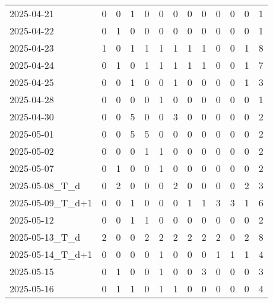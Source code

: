 \documentclass[dvipdfmx,oneside]{article}
\begin{document}
\begin{longtable}{lcccccccccccc}
        2025-04-21 &     0 &     0 &     1 &     0 &     0 &     0 &     0 &     0 &     0 &     0 &     0 &      1 \\
        2025-04-22 &     0 &     1 &     0 &     0 &     0 &     0 &     0 &     0 &     0 &     0 &     0 &      1 \\
        2025-04-23 &     1 &     0 &     1 &     1 &     1 &     1 &     1 &     1 &     0 &     0 &     1 &      8 \\
        2025-04-24 &     0 &     1 &     0 &     1 &     1 &     1 &     1 &     1 &     0 &     0 &     1 &      7 \\
        2025-04-25 &     0 &     0 &     1 &     0 &     0 &     1 &     0 &     0 &     0 &     0 &     1 &      3 \\
        2025-04-28 &     0 &     0 &     0 &     0 &     1 &     0 &     0 &     0 &     0 &     0 &     0 &      1 \\
        2025-04-30 &     0 &     0 &     5 &     0 &     0 &     3 &     0 &     0 &     0 &     0 &     0 &      2 \\
        2025-05-01 &     0 &     0 &     5 &     5 &     0 &     0 &     0 &     0 &     0 &     0 &     0 &      2 \\
        2025-05-02 &     0 &     0 &     0 &     1 &     1 &     0 &     0 &     0 &     0 &     0 &     0 &      2 \\
        2025-05-07 &     0 &     1 &     0 &     0 &     1 &     0 &     0 &     0 &     0 &     0 &     0 &      2 \\
  2025-05-08\_T\_d &     0 &     2 &     0 &     0 &     0 &     2 &     0 &     0 &     0 &     0 &     2 &      3 \\
2025-05-09\_T\_d+1 &     0 &     0 &     1 &     0 &     0 &     0 &     1 &     1 &     3 &     3 &     1 &      6 \\
        2025-05-12 &     0 &     0 &     1 &     1 &     0 &     0 &     0 &     0 &     0 &     0 &     0 &      2 \\
  2025-05-13\_T\_d &     2 &     0 &     0 &     2 &     2 &     2 &     2 &     2 &     2 &     0 &     2 &      8 \\
2025-05-14\_T\_d+1 &     0 &     0 &     0 &     0 &     1 &     0 &     0 &     0 &     1 &     1 &     1 &      4 \\
        2025-05-15 &     0 &     1 &     0 &     0 &     1 &     0 &     0 &     3 &     0 &     0 &     0 &      3 \\
        2025-05-16 &     0 &     1 &     1 &     0 &     1 &     1 &     0 &     0 &     0 &     0 &     0 &      4 \\

\end{longtable}
\end{document}
